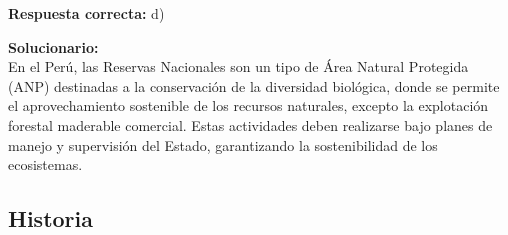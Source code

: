 \begin{enumerate}
	\textbf{Respuesta correcta:} d)
	
		\vspace{2mm}
	\textbf{Solucionario:}\\
	En el Perú, las Reservas Nacionales son un tipo de Área Natural Protegida (ANP) destinadas a la conservación de la diversidad biológica, donde se permite el aprovechamiento sostenible de los recursos naturales, excepto la explotación forestal maderable comercial.
	Estas actividades deben realizarse bajo planes de manejo y supervisión del Estado, garantizando la sostenibilidad de los ecosistemas.
	
	\vspace{6mm}
	
\end{enumerate}



\subsection*{Historia}

